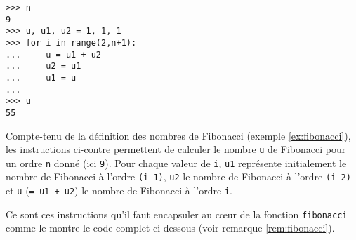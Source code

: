 \noindent\mbox{}\hspace*{1cm}\begin{py}{6cm}
\begin{verbatim}
>>> n
9
>>> u, u1, u2 = 1, 1, 1
>>> for i in range(2,n+1):
...     u = u1 + u2
...     u2 = u1
...     u1 = u
...
>>> u
55
\end{verbatim}
\end{py}\hfill
\begin{py}{6cm}
Compte-tenu de la définition des nombres de Fibonacci (exemple \ref{ex:fibonacci}),
les instructions ci-contre permettent de calculer le nombre {\tt u} de Fibonacci
pour un ordre {\tt n} donné (ici {\tt 9}). 
Pour chaque valeur de {\tt i}, {\tt u1} représente initialement le nombre de Fibonacci
à l'ordre {\tt (i-1)}, {\tt u2} le nombre de Fibonacci à l'ordre {\tt (i-2)} et {\tt u}
({\tt = u1 + u2}) le nombre de Fibonacci à l'ordre {\tt i}.
\end{py}
\hspace*{1cm}\mbox{}\vspace*{2mm}

Ce sont ces instructions qu'il faut 
encapsuler au c\oe ur de la fonction {\tt fibonacci} comme le montre le code complet ci-dessous
(voir remarque \ref{rem:fibonacci}).

